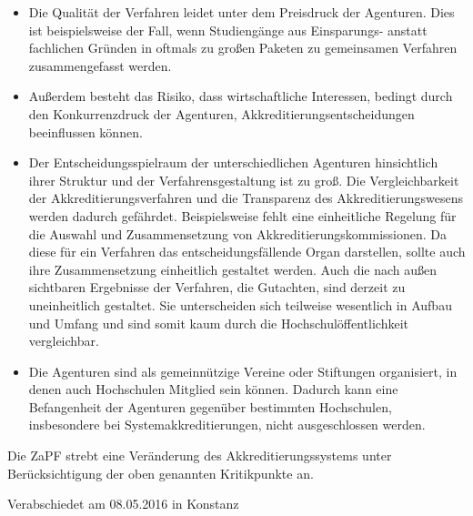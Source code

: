 \documentclass[DIV=calc]{scrartcl}
\begin{document}
    \begin{itemize}
        \item Die Qualit\"at der Verfahren leidet unter dem Preisdruck der
        Agenturen. Dies ist beispielsweise der Fall, wenn Studieng\"ange aus
        Einsparungs- anstatt fachlichen Gr\"unden in oftmals zu großen Paketen zu
        gemeinsamen Verfahren zusammengefasst werden.
        \item Außerdem  besteht das Risiko, dass wirtschaftliche Interessen, bedingt durch den Konkurrenzdruck der Agenturen, Akkreditierungsentscheidungen beeinflussen k\"onnen.
        \item Der Entscheidungsspielraum der unterschiedlichen Agenturen
        hinsichtlich ihrer Struktur und der Verfahrensgestaltung ist zu
        groß. Die Vergleichbarkeit der Akkreditierungsverfahren und die
        Transparenz des Akkreditierungswesens werden dadurch gef\"ahrdet.
        Beispielsweise fehlt eine einheitliche Regelung f\"ur die Auswahl und 
        Zusammensetzung von Akkreditierungskommissionen. Da diese f\"ur ein
        Verfahren das entscheidungsf\"allende Organ darstellen, sollte auch
        ihre Zusammensetzung einheitlich gestaltet werden. Auch die nach
        außen sichtbaren Ergebnisse der Verfahren, die Gutachten, sind
        derzeit zu uneinheitlich gestaltet. Sie unterscheiden sich teilweise
        wesentlich in Aufbau und Umfang und sind somit kaum durch die
        Hochschul\"offentlichkeit vergleichbar.
        \item Die Agenturen sind als
        gemeinn\"utzige Vereine oder  Stiftungen organisiert, in denen
        auch Hochschulen Mitglied sein k\"onnen.  Dadurch kann eine
        Befangenheit der Agenturen gegen\"uber bestimmten  Hochschulen,
        insbesondere bei Systemakkreditierungen, nicht  ausgeschlossen
        werden.
    \end{itemize}
    
    Die ZaPF strebt eine Ver\"anderung des Akkreditierungssystems unter
    Ber\"ucksichtigung der oben genannten Kritikpunkte an.
    
    \vfill
    \begin{flushright}
        Verabschiedet am 08.05.2016 in Konstanz
    \end{flushright}
    
    
    
    
\end{document}
